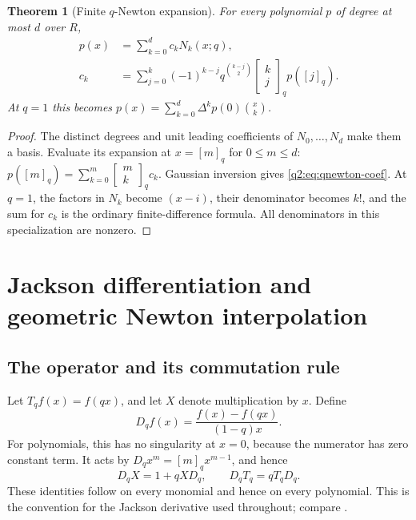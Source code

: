 \documentclass[11pt,a4paper,oneside,openany]{book}
\newtheorem{theorem}{Theorem}[chapter]
\theoremstyle{definition}
\theoremstyle{remark}
\newcommand{\GB}[3][q]{\begin{bmatrix}#2\\#3\end{bmatrix}_{#1}}
\newcommand{\qi}[2][q]{[#2]_{#1}}
\newcommand{\qb}[2]{\GB{#1}{#2}}
\begin{document}
\begin{theorem}[Finite $q$-Newton expansion]\label{q2:thm:qnewton}
For every polynomial $p$ of degree at most $d$ over $R$,
\begin{align}
 p(x)&=\sum_{k=0}^d c_k N_k(x;q),\label{q2:eq:qnewton}\\
 c_k&=\sum_{j=0}^k(-1)^{k-j}q^{\binom{k-j}2}\qb kj p(\qi j).
 \label{q2:eq:qnewton-coef}
\end{align}
At $q=1$ this becomes
$p(x)=\sum_{k=0}^d\Delta^kp(0)\binom xk$.
\end{theorem}
\begin{proof}
The distinct degrees and unit leading coefficients of $N_0,\ldots,N_d$ make
them a basis. Evaluate its expansion at $x=\qi m$ for $0\le m\le d$:
$p(\qi m)=\sum_{k=0}^m\qb mk c_k$. Gaussian inversion gives
\eqref{q2:eq:qnewton-coef}. At $q=1$, the factors in $N_k$ become
$(x-i)$, their denominator becomes $k!$, and the sum for $c_k$ is the ordinary
finite-difference formula. All denominators in this specialization are nonzero.
\end{proof}
\chapter{Jackson differentiation and geometric Newton interpolation}
\label{q1:qcc:jackson}
\section{The operator and its commutation rule}
Let \(T_qf(x)=f(qx)\), and let \(X\) denote multiplication by \(x\). Define
\begin{equation}\label{q1:qcc:jackson-def}
 D_qf(x)=\frac{f(x)-f(qx)}{(1-q)x}.
\end{equation}
For polynomials, this has no singularity at \(x=0\), because the numerator has
zero constant term. It acts by
\(D_qx^m=[m]_qx^{m-1}\), and hence
\begin{equation}\label{q1:qcc:q-weyl}
 D_qX=1+qXD_q,\qquad D_qT_q=qT_qD_q.
\end{equation}
These identities follow on every monomial and hence on every polynomial. This is
the convention for the Jackson derivative used throughout; compare
\cite{dlmf172}.
\end{document}
